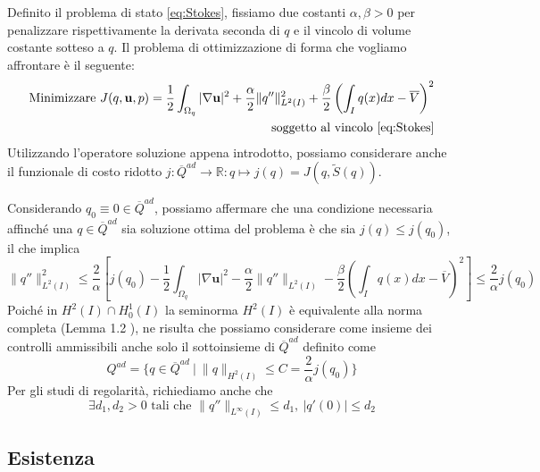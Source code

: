 \documentclass[a4paper,11pt,twoside]{article}
\newcommand{\beq}{\begin{equation}}
\newcommand{\eeq}{\end{equation}}
\theoremstyle{plain}
\theoremstyle{definition}
\theoremstyle{remark}
\begin{document}
Definito il problema di stato \eqref{eq:Stokes}, fissiamo due costanti $\alpha,\beta>0$ per penalizzare rispettivamente la derivata seconda di $q$ e il vincolo di volume costante sotteso a $q$. Il problema di ottimizzazione di forma che vogliamo affrontare \`e il seguente:
\begin{equation}
	\begin{aligned}
	\text{Minimizzare } J(q,\mathbf{u},p) = \frac{1}{2}\int_{\Omega_q}{|\nabla \mathbf{u}|^2} + \frac{\alpha}{2}\|q''\|_{L^2(I)}^2 +	\frac{\beta}{2}\left(\int_I {q(x)dx} - \overline{V}\right)^2\\
	\text{soggetto al vincolo \eqref{eq:Stokes}}
	\end{aligned}
\label{eq:minJ}
\end{equation}
Utilizzando l'operatore soluzione appena introdotto, possiamo considerare anche il funzionale di costo ridotto $j:\overline{Q}^{ad}\rightarrow\mathds{R}:q\mapsto j(q)=J(q,\widetilde{S}(q))$.

Considerando $q_0\equiv 0 \in \overline{Q}^{ad}$, possiamo affermare che una condizione necessaria affinch\'e una $q\in\overline{Q}^{ad}$ sia soluzione ottima del problema \`e che sia $j(q)\leq j(q_0)$, il che implica
$$ \|q''\|_{L^2(I)}^2 \leq \frac{2}{\alpha}\left[j(q_0)-  \frac{1}{2}\int_{\Omega_q}{|\nabla \mathbf{u}|^2} - \frac{\alpha}{2}\|q''\|_{L^2(I)} - \frac{\beta}{2}\left(\int_I {q(x)dx} - \overline{V}\right)^2\right] \leq \frac{2}{\alpha}j(q_0)$$
Poich\'e in $H^2(I)\cap H^1_0(I)$ la seminorma $H^2(I)$ \`e equivalente alla norma completa (Lemma 1.2 \cite{Kinigera}), ne risulta che possiamo considerare come insieme dei controlli ammissibili anche solo il sottoinsieme di $\overline{Q}^{ad}$ definito come
$$ Q^{ad} = \{q\in \overline{Q}^{ad}\ |\ \|q\|_{H^2(I)}\leq C=\frac{2}{\alpha}j(q_0)\} $$
Per gli studi di regolarit\`a, richiediamo anche che
\beq
	\exists d_1,d_2>0 \text{ tali che } \|q''\|_{L^\infty(I)}\leq d_1,\ |q'(0)|\leq d_2
\label{eq:Bad}
\eeq


\subsection{Esistenza}\label{sec:esistenza}
\end{document}
